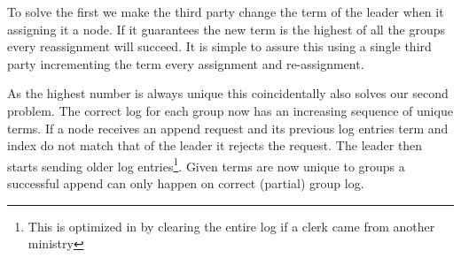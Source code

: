 To solve the first we make the third party change the term of the leader when it assigning it a node. If it guarantees the new term is the highest of all the groups every reassignment will succeed. It is simple to assure this using a single third party incrementing the term every assignment and re-assignment. 

As the highest number is always unique this coincidentally also solves our second problem. The correct log for each group now has an increasing sequence of unique terms. If a node receives an append request and its previous log entries term and index do not match that of the leader it rejects the request. The leader then starts sending older log entries\footnote{This is optimized in \name{} by clearing the entire log if a clerk came from another ministry}. Given terms are now unique to groups a successful append can only happen on correct (partial) group log.



%
